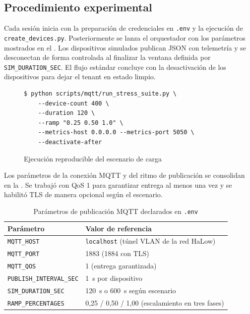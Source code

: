 ﻿\documentclass[conference]{IEEEtran}
\begin{document}
\subsection{Procedimiento experimental}
Cada sesi\'on inicia con la preparaci\'on de credenciales en \texttt{.env} y la ejecuci\'on de \texttt{create\_devices.py}. Posteriormente se lanza el orquestador con los par\'ametros mostrados en el . Los dispositivos simulados publican JSON con telemetr\'ia y se desconectan de forma controlada al finalizar la ventana definida por \texttt{SIM\_DURATION\_SEC}. El flujo est\'andar concluye con la desactivaci\'on de los dispositivos para dejar el tenant en estado limpio.

\begin{figure}[!t]
\centering
\begin{verbatim}
$ python scripts/mqtt/run_stress_suite.py \
    --device-count 400 \
    --duration 120 \
    --ramp "0.25 0.50 1.0" \
    --metrics-host 0.0.0.0 --metrics-port 5050 \
    --deactivate-after
\end{verbatim}
\caption{Ejecuci\'on reproducible del escenario de carga}
\label{lst:launcher}
\end{figure}

Los par\'ametros de la conexi\'on MQTT y del ritmo de publicaci\'on se consolidan en la . Se trabaj\'o con QoS 1 para garantizar entrega al menos una vez y se habilit\'o TLS de manera opcional seg\'un el escenario.

\begin{table}[!t]
\centering
\caption{Par\'ametros de publicaci\'on MQTT declarados en \texttt{.env}}
\label{tab:mqtt}
\begin{tabular}{@{}ll@{}}
\toprule
Par\'ametro & Valor de referencia \\
\midrule
\texttt{MQTT\_HOST} & \texttt{localhost} (t\'unel VLAN de la red HaLow) \\
\texttt{MQTT\_PORT} & 1883 (1884 con TLS) \\
\texttt{MQTT\_QOS} & 1 (entrega garantizada) \\
\texttt{PUBLISH\_INTERVAL\_SEC} & \SI{1}{\second} por dispositivo \\
\texttt{SIM\_DURATION\_SEC} & \SI{120}{\second} o \SI{600}{\second} seg\'un escenario \\
\texttt{RAMP\_PERCENTAGES} & 0,25 / 0,50 / 1,00 (escalamiento en tres fases) \\
\bottomrule
\end{tabular}
\end{table}
\end{document}

